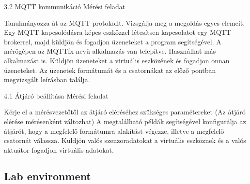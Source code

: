 \documentclass[a4paper]{article}
\begin{document}
3.2 MQTT kommunikáció
Mérési feladat

    Tanulmányozza át az MQTT protokollt. Vizsgálja meg a megoldás egyes elemeit.
    Egy MQTT kapcsolódásra képes eszközzel létesítsen kapcsolatot egy MQTT brokerrel, majd küldjön és fogadjon üzeneteket a program segítségével. A mérőgépen az MQTTfx nevű alkalmazás van telepítve. Használhat más alkalmazást is.
    Küldjön üzeneteket a virtuális eszközének és fogadjon onnan üzeneteket. Az üzenetek formátumát és a csatornákat az előző pontban megvizsgált leírásban találja.

4.1 Átjáró beállítása
Mérési feladat

    Kérje el a mérésvezetőtől az átjáró eléréséhez szükséges paramétereket (Az átjáró elérése mérésenként változhat)
    A megtalálható példák segítségével konfigurálja az átjárót, hogy a megfelelő formátumra alakítást végezze, illetve a megfelelő csatornát válassza.
    Küldjön valós szenzoradatokat a virtuális eszköznek és a valós aktuátor fogadjon virtuális adatokat.

\subsection{Lab environment}
\end{document}
